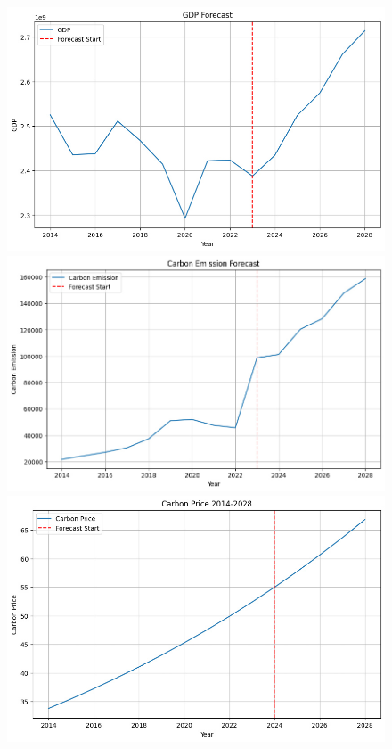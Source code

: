 \begin{figure}[H]
\begin{minipage}{0.32\textwidth}
    \end{minipage}
\end{figure}

\begin{figure}[H]
    \centering
    \begin{minipage}{0.32\textwidth}
        \centering
        \includegraphics[width=\textwidth]{GDP.jpg}
    \end{minipage}
    \begin{minipage}{0.32\textwidth}
        \centering
        \includegraphics[width=\textwidth]{Emission.jpg}
    \end{minipage}
    \begin{minipage}{0.32\textwidth}
        \centering
        \includegraphics[width=\textwidth]{Price.jpg}

\end{minipage}
\end{figure}
